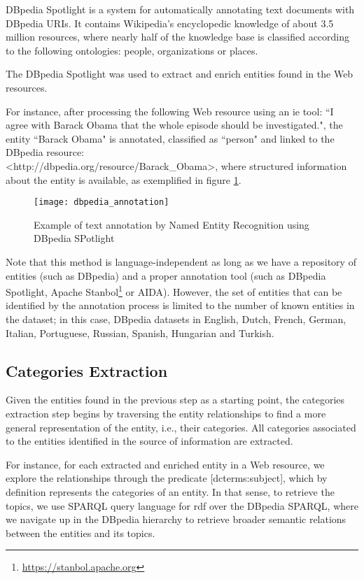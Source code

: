 DBpedia Spotlight is a system for automatically annotating text documents with DBpedia URIs. It contains Wikipedia's encyclopedic knowledge of about 3.5 million resources, where nearly half of the knowledge base is classified according to the following ontologies: people, organizations or places\cite{Mendes:2011}. 

The DBpedia Spotlight was used to extract and enrich entities found in the Web resources.

For instance, after processing the following Web resource using an \gls{ie} tool: ``I agree with Barack Obama that the whole episode should be investigated.", the entity  ``Barack Obama" is annotated, classified as ``person" and linked to the DBpedia resource: \\ 
 <http://dbpedia.org/resource/Barack\_Obama>, where structured information about the entity is available, as exemplified in figure \ref{fig:dbpedia-annotation}.
 
 
\begin{figure}[H]
  \texttt{[image: dbpedia\_annotation]}
  \caption{Example of text annotation by Named Entity Recognition using DBpedia SPotlight}
  \label{fig:dbpedia-annotation}
\end{figure}


 
Note that this method is language-independent as long as we have a repository of entities (such as DBpedia) and a proper annotation tool (such as DBpedia Spotlight, Apache Stanbol\footnote{\url{https://stanbol.apache.org}} or AIDA). However, the set of entities that can be identified by the annotation process is limited to the number of known entities in the dataset; in this case, DBpedia datasets in English, Dutch, French, German, Italian, Portuguese, Russian, Spanish, Hungarian and Turkish.

\subsection{\hspace*{3pt}  Categories Extraction}
\label{sec:categories-extraction}
Given the entities found in the previous step as a starting point, the categories extraction step begins by traversing the entity relationships to find a more general representation of the entity, i.e., their categories. All categories associated to the entities identified in the source of information are extracted. 

For instance, for each extracted and enriched entity in a Web resource, we explore the relationships through the predicate [dcterms:subject], which by definition represents the categories of an entity. In that sense, to retrieve the topics, we use SPARQL query language for \gls{rdf} over the DBpedia SPARQL, where we navigate up in the DBpedia hierarchy to retrieve broader semantic relations between the entities and its topics. 

